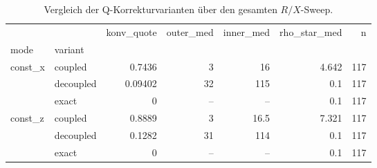 \begin{table}[htbp]
\centering
\caption{Vergleich der Q-Korrekturvarianten \"uber den gesamten $R/X$-Sweep.}
\label{tab:rx-variants}
\begin{tabular}{llrrrrr}
\toprule
 &  & konv_quote & outer_med & inner_med & rho_star_med & n \\
mode & variant &  &  &  &  &  \\
\midrule
\multirow[t]{3}{*}{const_x} & coupled & 0.7436 & 3 & 16 & 4.642 & 117 \\
 & decoupled & 0.09402 & 32 & 115 & 0.1 & 117 \\
 & exact & 0 & {--} & {--} & 0.1 & 117 \\
\cline{1-7}
\multirow[t]{3}{*}{const_z} & coupled & 0.8889 & 3 & 16.5 & 7.321 & 117 \\
 & decoupled & 0.1282 & 31 & 114 & 0.1 & 117 \\
 & exact & 0 & {--} & {--} & 0.1 & 117 \\
\cline{1-7}
\bottomrule
\end{tabular}
\end{table}

